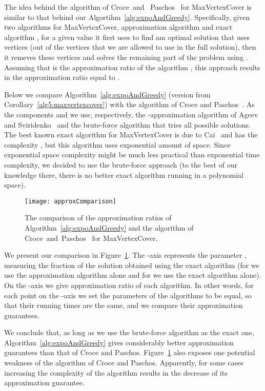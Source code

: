 \documentclass[11pt]{article}
\begin{document}
The idea behind the algorithm of Croce~and
~Paschos~\cite{cro-pas:j:cover} for MaxVertexCover is similar to that
behind our Algortihm~\ref{alg:expoAndGreedy}.  Specifically, given two
algorithms for MaxVertexCover, approximation algorithm  and
exact algorithm , for a given value  it first uses
 to find am optimal solution that uses  vertices (out
of the  vertices that we are allowed to use in the full solution),
then it remeves these  vertices and solves the remaining part of
the problem using .  Assuming that  is the
approximation ratio of the algorithm , this approach
results in the approximation ratio equal to .

Below we compare Algorithm~\ref{alg:expoAndGreedy} (version from
Corollary~\ref{alg5:maxvertexcover}) with the algorithm of Croce and
Paschos~\cite{cro-pas:j:cover}. As the components  and
 we use, respectively, the -approximation
algorithm of Ageev and Sviridenko~\cite{age-svi:b:covers} and the
brute-force algorithm that tries all possible solutions.  The best
known exact algorithm for MaxVertexCover is due to
Cai~\cite{cai:j:cardinality-constrained} and has the complexity
, but this algorithm uses exponential amount of space.
Since exponential space complexity might be much less practical than
exponential time complexity, we decided to use the brute-force
approach (to the best of our knowledge there, there is no better exact
algorithm running in a polynomial space).
\begin{figure}[tb]
  \begin{center}
    \texttt{[image: approxComparison]}
  \end{center}
  \vspace{-0.75cm}
  \caption{The comparison of the approximation ratios of Algorithm~\ref{alg:expoAndGreedy} and the algorithm of Croce~and~Paschos~\cite{cro-pas:j:cover} for MaxVertexCover.}
  \label{fig:approximationComparison}
\end{figure}
We present our comparison in Figure~\ref{fig:approximationComparison}.
The -axis represents the parameter , measuring the
fraction of the solution obtained using the exact algorithm (for 
we use the approximation algorithm alone and for  we use the exact
algorithm alone). On the -axis we give approximation ratio of each
algorithm.  In other words, for each point on the -axis we set the
 parameters of the algorithms to be equal, so that their running
times are the same, and we compare their approximation guarantees.

We conclude that, as long as we use the brute-force algorithm as the
exact one, Algorithm~\ref{alg:expoAndGreedy} gives considerably better
approximation guarantees than that of Croce and
Paschos. Figure~\ref{fig:approximationComparison} also exposes one
potential weakness of the algorithm of Croce and Paschos. Apparently,
for some cases increasing the complexity of the algorithm results in
the decrease of its approximation guarantee.
\end{document}
